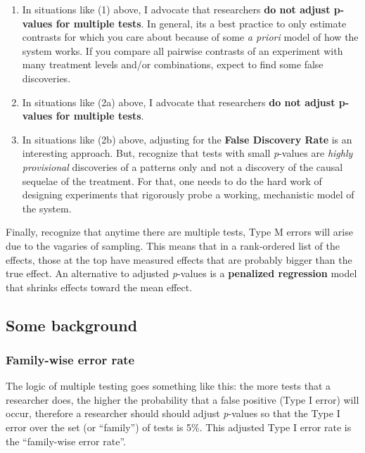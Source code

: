\documentclass[]{book}
\providecommand{\tightlist}{%
  \setlength{\itemsep}{0pt}\setlength{\parskip}{0pt}}
\begin{document}
\begin{enumerate}
\def\labelenumi{\arabic{enumi}.}
\tightlist
\item
  In situations like (1) above, I advocate that researchers \textbf{do not adjust p-values for multiple tests}. In general, its a best practice to only estimate contrasts for which you care about because of some \emph{a priori} model of how the system works. If you compare all pairwise contrasts of an experiment with many treatment levels and/or combinations, expect to find some false discoveries.
\item
  In situations like (2a) above, I advocate that researchers \textbf{do not adjust p-values for multiple tests}.
\item
  In situations like (2b) above, adjusting for the \textbf{False Discovery Rate} is an interesting approach. But, recognize that tests with small \emph{p}-values are \emph{highly provisional} discoveries of a patterns only and not a discovery of the causal sequelae of the treatment. For that, one needs to do the hard work of designing experiments that rigorously probe a working, mechanistic model of the system.
\end{enumerate}

Finally, recognize that anytime there are multiple tests, Type M errors will arise due to the vagaries of sampling. This means that in a rank-ordered list of the effects, those at the top have measured effects that are probably bigger than the true effect. An alternative to adjusted \emph{p}-values is a \textbf{penalized regression} model that shrinks effects toward the mean effect.

\hypertarget{some-background}{%
\subsection{Some background}\label{some-background}}

\hypertarget{family-wise-error-rate}{%
\subsubsection{Family-wise error rate}\label{family-wise-error-rate}}

The logic of multiple testing goes something like this: the more tests that a researcher does, the higher the probability that a false positive (Type I error) will occur, therefore a researcher should should adjust \emph{p}-values so that the Type I error over the set (or ``family'') of tests is 5\%. This adjusted Type I error rate is the ``family-wise error rate''.
\end{document}
